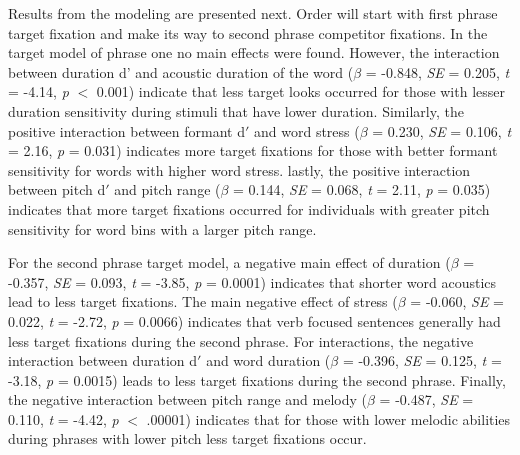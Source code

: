 Results from the modeling are presented next. Order will start with first phrase target fixation and make its way to second phrase competitor fixations. In the target model of phrase one no main effects were found. However, the interaction between duration d' and acoustic duration of the word ($\beta$ = -0.848, \textit{SE} = 0.205, \textit{t} = -4.14, \textit{p} $<$ 0.001) indicate that less target looks occurred for those with lesser duration sensitivity during stimuli that have lower duration. Similarly, the positive interaction between formant d$'$ and word stress ($\beta$ = 0.230, \textit{SE} = 0.106, \textit{t} = 2.16, \textit{p} = 0.031) indicates more target fixations for those with better formant sensitivity for words with higher word stress. lastly, the positive interaction between pitch d$'$ and pitch range ($\beta$ = 0.144, \textit{SE} = 0.068, \textit{t} = 2.11, \textit{p} = 0.035) indicates that more target fixations occurred for individuals with greater pitch sensitivity for word bins with a larger pitch range.

 For the second phrase target model, a negative main effect of duration ($\beta$ = -0.357, \textit{SE} = 0.093, \textit{t} = -3.85, \textit{p} = 0.0001) indicates that shorter word acoustics lead to less target fixations. The main negative effect of stress ($\beta$ = -0.060, \textit{SE} = 0.022, \textit{t} = -2.72, \textit{p} = 0.0066) indicates that verb focused sentences generally had less target fixations during the second phrase. For interactions, the negative interaction between duration d$'$ and word duration ($\beta$ = -0.396, \textit{SE} = 0.125, \textit{t} = -3.18, \textit{p} = 0.0015) leads to less target fixations during the second phrase. Finally, the negative interaction between pitch range and melody ($\beta$ = -0.487, \textit{SE} = 0.110, \textit{t} = -4.42, \textit{p} $<$ .00001) indicates that for those with lower melodic abilities during phrases with lower pitch less target fixations occur.

